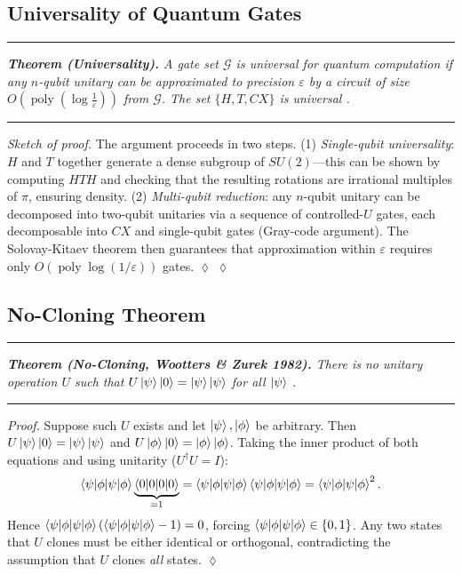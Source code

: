 \documentclass[aps, reprint, twocolumn, superscriptaddress, floatfix]{revtex4-2}
\newenvironment{statement}{%
  \par\addvspace{5pt}%
  \noindent\rule{\linewidth}{0.4pt}\nopagebreak\par\vspace{2pt}%
  \noindent\begingroup\small\itshape}{%
  \endgroup\par\vspace{2pt}\nopagebreak%
  \noindent\rule{\linewidth}{0.4pt}\par\addvspace{5pt}}
\newenvironment{proofsketch}[1][Sketch of proof]{%
  \par\smallskip\noindent\textit{#1.}\enspace}{%
  \hspace*{\fill}$\lozenge$\par\smallskip}
\begin{document}
\subsection{Universality of Quantum Gates}
\label{ssec:universality}

\begin{statement}
\textbf{Theorem (Universality).}
A gate set $\mathcal{G}$ is \emph{universal for quantum computation} if any
$n$-qubit unitary can be approximated to precision $\varepsilon$ by a circuit of
size $O\!\left(\operatorname{poly}\!\left(\log\tfrac{1}{\varepsilon}\right)\right)$ from $\mathcal{G}$.
The set $\{H, T, CX\}$ is universal \cite{nielsen2010quantum}.
\end{statement}

\begin{proofsketch}
The argument proceeds in two steps.
(1) \textit{Single-qubit universality}: $H$ and $T$ together generate a dense
subgroup of $SU(2)$---this can be shown by computing $HTH$ and checking that the
resulting rotations are irrational multiples of $\pi$, ensuring density.
(2) \textit{Multi-qubit reduction}: any $n$-qubit unitary can be decomposed into
two-qubit unitaries via a sequence of controlled-$U$ gates, each decomposable into
$CX$ and single-qubit gates (Gray-code argument).  The Solovay-Kitaev theorem then
guarantees that approximation within $\varepsilon$ requires only
$O(\operatorname{poly}\log(1/\varepsilon))$ gates. $\lozenge$
\end{proofsketch}

\subsection{No-Cloning Theorem}
\label{ssec:no-cloning}

\begin{statement}
\textbf{Theorem (No-Cloning, Wootters \& Zurek 1982).}
There is no unitary operation $U$ such that
$U\ket{\psi}\ket{0} = \ket{\psi}\ket{\psi}$ for all $\ket{\psi}$
\cite{wootters1982single}.
\end{statement}

\begin{proofsketch}[Proof]
Suppose such $U$ exists and let $\ket{\psi},\ket{\phi}$ be arbitrary.  Then
$U\ket{\psi}\ket{0} = \ket{\psi}\ket{\psi}$ and
$U\ket{\phi}\ket{0} = \ket{\phi}\ket{\phi}$.
Taking the inner product of both equations and using unitarity ($U^\dagger U=I$):
\begin{equation}
  \braket{\psi|\phi}\underbrace{\braket{0|0}}_{=1}
  = \braket{\psi|\phi}\braket{\psi|\phi}
  = \braket{\psi|\phi}^2.
\end{equation}
Hence $\braket{\psi|\phi}(\braket{\psi|\phi}-1) = 0$, forcing
$\braket{\psi|\phi} \in \{0,1\}$.  Any two states that $U$ clones must be either
identical or orthogonal, contradicting the assumption that $U$ clones
\emph{all} states.
\end{proofsketch}
\end{document}
